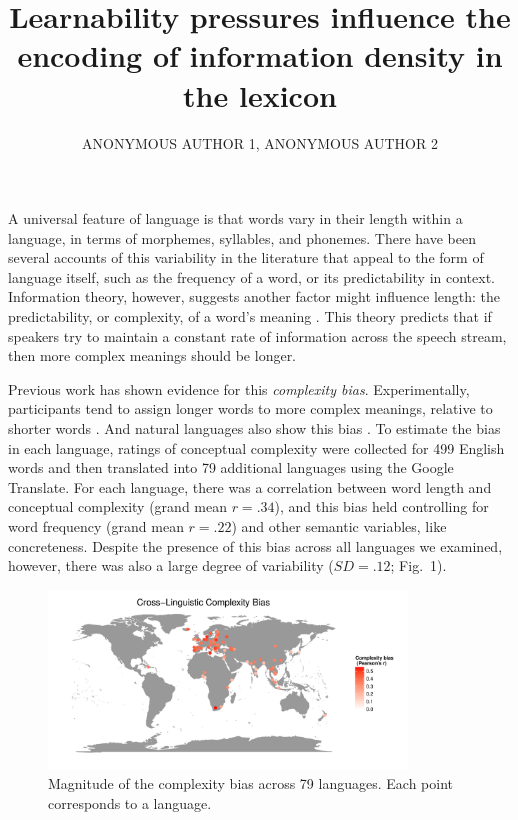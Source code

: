 \documentclass{evolang11}
\begin{document}
\title{Learnability pressures influence the encoding of information density in the lexicon}

\author{ANONYMOUS AUTHOR 1, ANONYMOUS AUTHOR 2}

\address{University Department, University Name \\ City, Country\\email1@university, email2@university}  

\maketitle



A universal feature of language is that words vary in their length within a language, in terms of morphemes, syllables, and phonemes. There have been several accounts of this variability in the literature that appeal to the form of language itself, such as the frequency of a word, or its predictability in context. Information theory, however, suggests another factor might influence length: the predictability, or complexity, of a word's meaning \cite{frank2008speaking}. This theory predicts that if speakers try to maintain a constant rate of information  across the speech stream, then more complex meanings should be longer. 

Previous work has shown evidence for this {\it complexity bias}. Experimentally, participants tend to assign longer words to more complex meanings, relative to shorter words \cite{lewisstructure2014}. And natural languages also show this bias \cite{lewisFrankUR}. To estimate the bias in each language, ratings of conceptual complexity were collected for 499 English words and then translated into 79 additional languages using the Google Translate. For each language, there was a correlation between word length and conceptual complexity (grand mean $r =  .34$), and this bias held controlling for word frequency (grand mean $r = .22$) and other semantic variables, like concreteness. Despite the presence of this bias across all languages we examined, however, there was also a large degree of variability ($SD = .12$;  Fig.\ 1). 

 
\begin{figure}
\includegraphics[width=3.75in]{Fig1.pdf}
\caption{Magnitude of the complexity bias across 79 languages. Each point corresponds to a language. \label{fig1}}
\end{figure}
\end{document}
